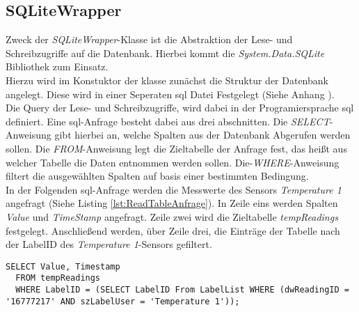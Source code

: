 \subsection*{SQLiteWrapper}
Zweck der \textit{SQLiteWrapper}-Klasse ist die Abstraktion der Lese- und Schreibzugriffe auf die Datenbank.  Hierbei kommt die \textit{System.Data.SQLite} Bibliothek zum Einsatz. \\
Hierzu wird  im Konstuktor der klasse zunächst die Struktur der Datenbank angelegt. Diese wird in einer Seperaten \ac{sql} Datei Festgelegt (Siehe Anhang ).\\
Die Query der Lese- und Schreibzugriffe, wird dabei in der Programiersprache \ac{sql} definiert. Eine \ac{sql}-Anfrage besteht dabei aus drei abschnitten. Die \textit{SELECT}-Anweisung gibt hierbei an, welche Spalten aus der Datenbank Abgerufen werden sollen. Die \textit{FROM}-Anweisung legt die Zieltabelle der Anfrage fest, das heißt aus welcher Tabelle die Daten entnommen werden sollen. Die-\textit{WHERE}-Anweisung filtert die ausgewählten Spalten auf basis einer bestimmten Bedingung.\\
In der Folgenden \ac{sql}-Anfrage werden die Messwerte des Sensors \textit{Temperature 1} angefragt (Siehe Listing \ref{lst:ReadTableAnfrage}). In Zeile eins werden Spalten \textit{Value} und \textit{TimeStamp} angefragt. Zeile zwei wird die Zieltabelle \textit{tempReadings} festgelegt. Anschließend werden, über Zeile drei, die Einträge der Tabelle nach der LabelID des \textit{Temperature 1}-Sensors gefiltert.  
\begin{lstlisting}[caption={Query Anfrage zum Auslesen eines bestimmten Sensorwertes}, label={lst:ReadTableAnfrage}]
  SELECT Value, Timestamp 
  FROM tempReadings 
  WHERE LabelID = (SELECT LabelID From LabelList WHERE (dwReadingID = '16777217' AND szLabelUser = 'Temperature 1'));
\end{lstlisting}

